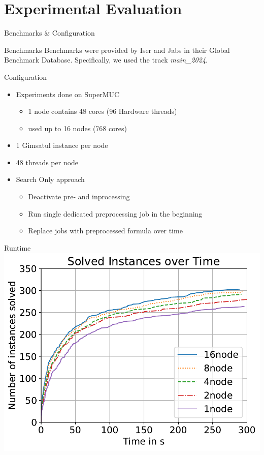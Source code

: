 \documentclass{beamer}
\begin{document}
\section{Experimental Evaluation}
\begin{frame}{Benchmarks \& Configuration}
    \begin{block}{Benchmarks}
        Benchmarks were provided by Iser and Jabs in 
        their Global Benchmark Database. Specifically, 
        we used the track \textit{main\_2024}.
    \end{block}

    \begin{block}{Configuration}
        \begin{itemize}
            \item Experiments done on SuperMUC
            \begin{itemize}
                \item 1 node contains 48 cores (96 Hardware threads)
                \item used up to 16 nodes (768 cores)
            \end{itemize}
            \item 1 Gimsatul instance per node
            \item 48 threads per node
            \item Search Only approach
            \begin{itemize}
                \item Deactivate pre- and inprocessing
                \item Run single dedicated preprocessing job in the beginning
                \item Replace jobs with preprocessed formula over time
            \end{itemize}
        \end{itemize}
    \end{block}
\end{frame}

\begin{frame}{Runtime}
    \center
    \includegraphics[scale=.55]{plots/cumulative_runtime/scalability_gim.pdf}
\end{frame}
\end{document}

